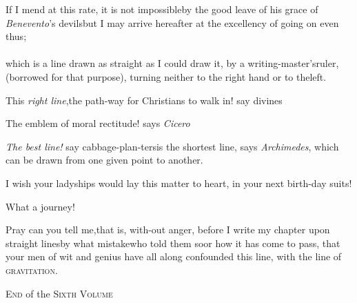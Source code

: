 \documentclass{article}
\begin{document}
If I mend at this rate, it is not impossible\tsh by the
good leave of his grace of \textit{Benevento}’s
devils\tsh but I may arrive hereafter at the excellency of\break
going on even thus;\\[10pt]
\\[10pt]
which is a line drawn as straight as I could draw
it, by a writing-master’s\break ruler, (borrowed for that purpose),
turning neither to the right hand or to the\break left.

This \textit{right line},\tsk the path-way for Christians to
walk in! say divines\tsh

\tsh The emblem of moral rectitude! says
\textit{Cicero}\tsh

\tsh \textit{The best line!} say cabbage-plan-\break ters\tsh is the shortest line,
says \textit{Archi\-medes},
which can be drawn from one given point to
another.\tsh

I wish your ladyships would lay this matter to heart, in your
next birth-\break day suits!

\tsh What a journey!

Pray can you tell me,\tsk that is, with-\break out anger, before I
write my chapter upon straight lines\tsh by what
mistake\tsh who told them so\tsh or how it has
come to pass, that your men of wit and genius have all along
confounded this line, with the line of
\textsc{gravitation}.

\bigskip
\centerline{\textsc{End} of the \textsc{Sixth Volume}}
\end{document}
